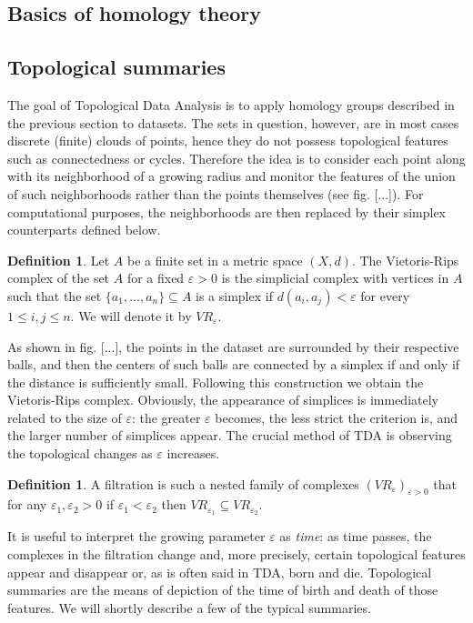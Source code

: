 \documentclass[12pt]{article}
\theoremstyle{plain}
\theoremstyle{definition}
\newtheorem{definition}[theorem]{Definition}
\theoremstyle{remark}
\begin{document}
	\subsection{Basics of homology theory}
	
	\subsection{Topological summaries}
	
	The goal of Topological Data Analysis is to apply homology groups described in the previous section to datasets. The sets in question, however, are in most cases discrete (finite) clouds of points, hence they do not possess topological features such as connectedness or cycles. Therefore the idea is to consider each point along with its neighborhood of a growing radius and monitor the features of the union of such neighborhoods rather than the points themselves (see fig. [...]). For computational purposes, the neighborhoods are then replaced by their simplex counterparts defined below.
	
	\begin{definition}
		Let $A$ be a finite set in a metric space $(X,d)$. The Vietoris-Rips complex of the set $A$ for a fixed $\varepsilon>0$ is the simplicial complex with vertices in $A$ such that the set $\{a_1, \dots, a_n\}\subseteq A$ is a simplex if $d(a_i,a_j)<\varepsilon$ for every $1\leqslant i, j\leqslant n$. We will denote it by $VR_\varepsilon$.
	\end{definition}

As shown in fig. [...], the points in the dataset are surrounded by their respective balls, and then the centers of such balls are connected by a simplex if and only if the distance is sufficiently small. Following this construction we obtain the Vietoris-Rips complex. Obviously, the appearance of simplices is immediately related to the size of $\varepsilon$: the greater $\varepsilon$ becomes, the less strict the criterion is, and the larger number of simplices appear. The crucial method of TDA is observing the topological changes as $\varepsilon$ increases.

\begin{definition}
	A filtration is such a nested family of complexes $(VR_\varepsilon)_{\varepsilon>0}$ that for any $\varepsilon_1, \varepsilon_2>0$ if $\varepsilon_1<\varepsilon_2$ then $VR_{\varepsilon_1} \subseteq VR_{\varepsilon_2}$.
\end{definition}

It is useful to interpret the growing parameter $\varepsilon$ as \textit{time}: as time passes, the complexes in the filtration change and, more precisely, certain topological features appear and disappear or, as is often said in TDA, born and die. Topological summaries are the means of depiction of the time of birth and death of those features. We will shortly describe a few of the typical summaries.
	
\end{document}
